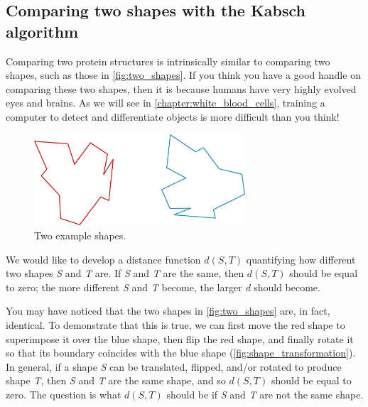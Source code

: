 \subsection{Comparing two shapes with the Kabsch algorithm}

Comparing two protein structures is intrinsically similar to comparing two shapes, such as those in \autoref{fig:two_shapes}. If you think you have a good handle on comparing these two shapes, then it is because humans have very highly evolved eyes and brains. As we will see in \autoref{chapter:white_blood_cells}, training a computer to detect and differentiate objects is more difficult than you think!

\begin{figure}[h]
	\centering
	\mySfFamily
	\includegraphics[width = 0.7\textwidth]{../images_CMYK/two_shapes}
	\caption{Two example shapes.}
	\label{fig:two_shapes}
\end{figure}

We would like to develop a distance function $d(S, T)$ quantifying how different two shapes \textit{S} and \textit{T} are. If \textit{S} and \textit{T} are the same, then $d(S, T)$ should be equal to zero; the more different \textit{S} and \textit{T} become, the larger \textit{d} should become.

You may have noticed that the two shapes in \autoref{fig:two_shapes} are, in fact, identical. To demonstrate that this is true, we can first move the red shape to superimpose it over the blue shape, then flip the red shape, and finally rotate it so that its boundary coincides with the blue shape (\autoref{fig:shape_transformation}). In general, if a shape \textit{S} can be translated, flipped, and/or rotated to produce shape \textit{T}, then \textit{S} and \textit{T} are the same shape, and so $d(S, T)$ should be equal to zero. The question is what $d(S, T)$ should be if \textit{S} and \textit{T} are not the same shape.\\

